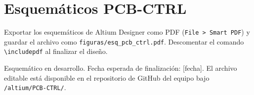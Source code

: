 \chapter{Esquemáticos PCB-CTRL}
\label{chap:anexo_esq_ctrl}

\begin{infobox}
  Exportar los esquemáticos de Altium Designer como PDF
  (\texttt{File > Smart PDF}) y guardar el archivo como
  \texttt{figuras/esq\_pcb\_ctrl.pdf}.
  Descomentar el comando \texttt{\textbackslash includepdf} al finalizar
  el diseño.
\end{infobox}

% 

\begin{riskbox}
  Esquemático en desarrollo. Fecha esperada de finalización: [fecha].
  El archivo editable está disponible en el repositorio de GitHub del equipo
  bajo \texttt{/altium/PCB-CTRL/}.
\end{riskbox}

